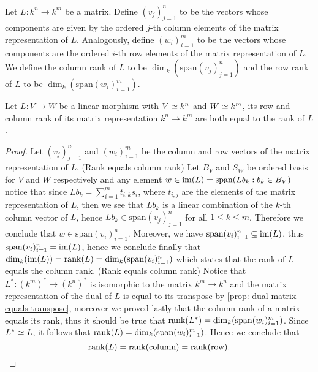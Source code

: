 \begin{definition}\label{def: column and row rank}
    Let \(L: k^n \to k^m\) be a matrix. Define \((v_j)_{j=1}^n\) to be the vectors
    whose components are given by the ordered \(j\)-th column elements of the
    matrix representation of \(L\). Analogously, define \((w_i)_{i=1}^m\) to be
    the vectors whose components are the ordered \(i\)-th row elements of the
    matrix representation of \(L\). We define the column rank of \(L\) to be
    \(\dim_k(\mathrm{span}(v_j)_{j=1}^n)\) and the row rank of \(L\) to be
    \(\dim_k(\mathrm{span}(w_i)_{i=1}^m)\).
\end{definition}

\begin{proposition}
    \label{prop: column and row rank equal the rank}
    Let \(L: V \to W\) be a linear morphism with \(V \simeq k^n\) and \(W \simeq
    k^m\), its row and column rank of its matrix representation \(k^n \to k^m\)
    are both equal to the rank of \(L\).
\end{proposition}

\begin{proof}
    Let \((v_j)_{j=1}^n\) and  \((w_i)_{i=1}^m\) be the column and row vectors of
    the matrix representation of \(L\).
    (Rank equals column rank) Let \(B_V\) and \(S_W\) be ordered basis for \(V\)
    and \(W\) respectively and any element \(w \in \operatorname{im}(L) = \mathrm{span}(Lb_k :
    b_k \in B_V)\) notice that since \(Lb_k = \sum_{i=1}^m t_{i, k} s_i\), where
    \(t_{i,j}\) are the elements of the matrix representation of \(L\), then we
    see that \(Lb_k\) is a linear combination of the \(k\)-th column vector of
    \(L\), hence \(Lb_k \in \mathrm{span}(v_j)_{j=1}^n\) for all \(1 \leq k \leq
    m\). Therefore we conclude that \(w \in \mathrm{span}(v_i)_{i=1}^n\).
    Moreover, we have \(\mathrm{span}(v_i)_{i=1}^n \subseteq \operatorname{im}(L)\), thus
    \(\mathrm{span}(v_i)_{i=1}^n = \operatorname{im}(L)\), hence we conclude finally that
    \(\dim_k(\operatorname{im}(L)) = \operatorname{rank}(L) = \dim_k(\mathrm{span}(v_i)_{i=1}^n)\) which
    states that the rank of \(L\) equals the column rank.
    (Rank equals column rank) Notice that \(L^\ast : (k^m)^\ast \to (k^n)^\ast\)
    is isomorphic to the matrix \(k^m \to k^n\) and the matrix representation of
    the dual of \(L\) is equal to its transpose by \ref{prop: dual matrix equals
        transpose}, moreover we proved lastly that the column rank of a matrix equals
    its rank, thus it should be true that \(\operatorname{rank}(L^\ast) =
    \dim_k(\mathrm{span}(w_i)_{i=1}^m)\). Since \(L^\ast \simeq L\), it follows that
    \(\operatorname{rank}(L) = \dim_k(\mathrm{span}(w_i)_{i=1}^m)\). Hence we conclude that
    \[
        \operatorname{rank}(L) = \operatorname{rank}(\text{column}) = \operatorname{rank}(\text{row}).
    \]
\end{proof}

